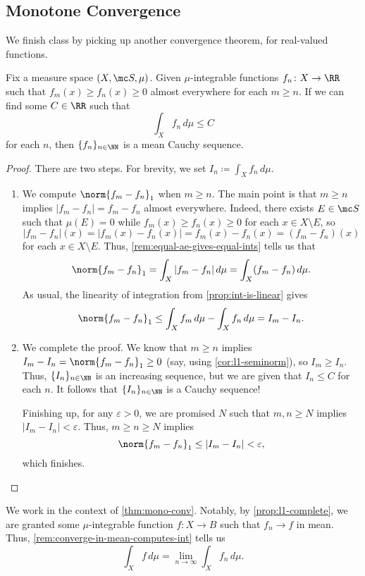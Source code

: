 \documentclass[../notes.tex]{subfiles}
\begin{document}
\subsection{Monotone Convergence}
We finish class by picking up another convergence theorem, for real-valued functions.
\begin{theorem} \label{thm:mono-conv}
	Fix a measure space $(X,\mc S,\mu)$. Given $\mu$-integrable functions $f_n\colon X\to\RR$ such that $f_m(x)\ge f_n(x)\ge0$ almost everywhere for each $m\ge n$. If we can find some $C\in\RR$ such that
	\[\int_Xf_n\,d\mu\le C\]
	for each $n$, then $\{f_n\}_{n\in\NN}$ is a mean Cauchy sequence.
\end{theorem}
\begin{proof}
	There are two steps. For brevity, we set $I_n\coloneqq\int_Xf_n\,d\mu$.
	\begin{enumerate}
		\item We compute $\norm{f_m-f_n}_1$ when $m\ge n$. The main point is that $m\ge n$ implies $|f_m-f_n|=f_m-f_n$ almost everywhere. Indeed, there exists $E\in\mc S$ such that $\mu(E)=0$ while $f_m(x)\ge f_n(x)\ge0$ for each $x\in X\setminus E$, so
		\[|f_m-f_n|(x)=|f_m(x)-f_n(x)|=f_m(x)-f_n(x)=(f_m-f_n)(x)\]
		for each $x\in X\setminus E$. Thus, \autoref{rem:equal-ae-gives-equal-ints} tells us that
		\[\norm{f_m-f_n}_1=\int_X|f_m-f_n|\,d\mu=\int_X(f_m-f_n)\,d\mu.\]
		As usual, the linearity of integration from \autoref{prop:int-is-linear} gives
		\[\norm{f_m-f_n}_1\le\int_Xf_m\,d\mu-\int_Xf_n\,d\mu=I_m-I_n.\]

		\item We complete the proof. We know that $m\ge n$ implies $I_m-I_n=\norm{f_m-f_n}_1\ge0$ (say, using \autoref{cor:l1-seminorm}), so $I_m\ge I_n$. Thus, $\{I_n\}_{n\in\NN}$ is an increasing sequence, but we are given that $I_n\le C$ for each $n$. It follows that $\{I_n\}_{n\in\NN}$ is a Cauchy sequence!

		Finishing up, for any $\varepsilon>0$, we are promised $N$ such that $m,n\ge N$ implies $|I_m-I_n|<\varepsilon$. Thus, $m\ge n\ge N$ implies
		\[\norm{f_m-f_n}_1\le|I_m-I_n|<\varepsilon,\]
		which finishes.
		\qedhere
	\end{enumerate}
\end{proof}
\begin{remark} \label{rem:apply-mono-conv}
	We work in the context of \autoref{thm:mono-conv}. Notably, by \autoref{prop:l1-complete}, we are granted some $\mu$-integrable function $f\colon X\to B$ such that $f_n\to f$ in mean. Thus, \autoref{rem:converge-in-mean-computes-int} tells us
	\[\int_Xf\,d\mu=\lim_{n\to\infty}\int_Xf_n\,d\mu.\]
\end{remark}
\end{document}
